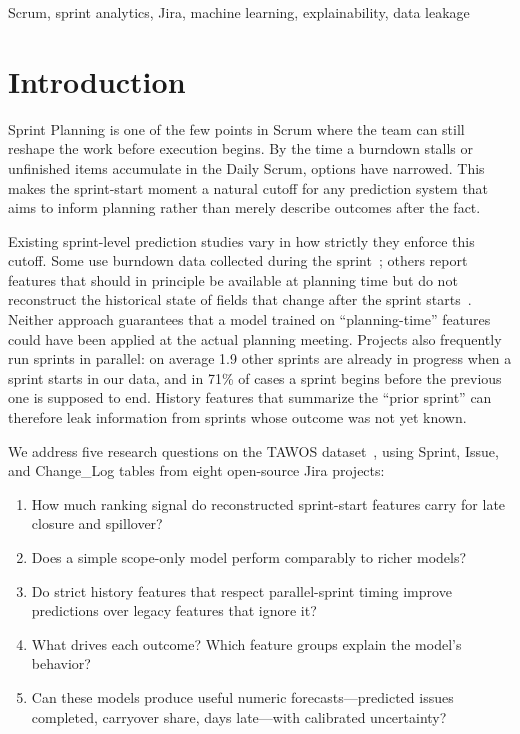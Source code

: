 \documentclass[conference]{IEEEtran}
\begin{document}
\begin{IEEEkeywords}
Scrum, sprint analytics, Jira, machine learning, explainability, data leakage
\end{IEEEkeywords}

\section{Introduction}
Sprint Planning is one of the few points in Scrum where the team can still reshape the work before execution begins.
By the time a burndown stalls or unfinished items accumulate in the Daily Scrum, options have narrowed.
This makes the sprint-start moment a natural cutoff for any prediction system that aims to inform planning rather than merely describe outcomes after the fact.

Existing sprint-level prediction studies vary in how strictly they enforce this cutoff.
Some use burndown data collected during the sprint~\cite{perezcastillo2024};
others report features that should in principle be available at planning time but do not reconstruct the historical state of fields that change after the sprint starts~\cite{obike2025}.
Neither approach guarantees that a model trained on ``planning-time'' features could have been applied at the actual planning meeting.
Projects also frequently run sprints in parallel: on average 1.9 other sprints are already in progress when a sprint starts in our data, and in 71\% of cases a sprint begins before the previous one is supposed to end.
History features that summarize the ``prior sprint'' can therefore leak information from sprints whose outcome was not yet known.

We address five research questions on the TAWOS dataset~\cite{tawosi2022}, using Sprint, Issue, and Change\_Log tables from eight open-source Jira projects:

\begin{enumerate}[leftmargin=*,nosep,label=\textbf{RQ\arabic*.}]
\item How much ranking signal do reconstructed sprint-start features carry for late closure and spillover?
\item Does a simple scope-only model perform comparably to richer models?
\item Do strict history features that respect parallel-sprint timing improve predictions over legacy features that ignore it?
\item What drives each outcome? Which feature groups explain the model's behavior?
\item Can these models produce useful numeric forecasts---predicted issues completed, carryover share, days late---with calibrated uncertainty?
\end{enumerate}
\end{document}
